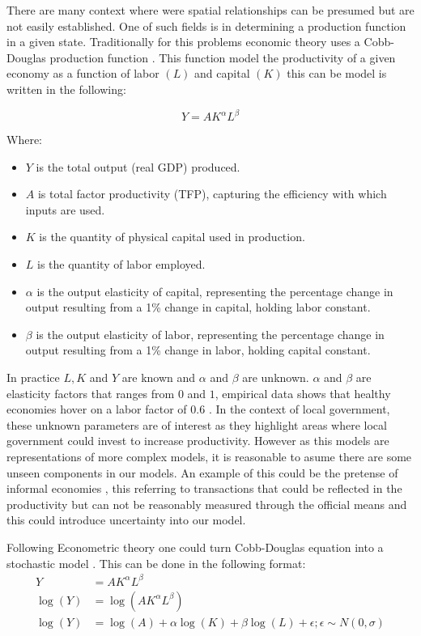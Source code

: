 

There are many context where were spatial relationships can be presumed but are not easily established. One
of such fields is in determining a production function in a given state. Traditionally for this problems economic
theory uses a Cobb-Douglas production function \cite{cobb1928theory}. This function model the productivity of a
given economy as a function of labor $(L)$ and capital $(K)$ this can be model is written in the following:

$$
	Y = A K^\alpha L^\beta
$$

Where:
\begin{itemize}
	\item $Y$ is the total output (real GDP) produced.
	\item $A$ is total factor productivity (TFP), capturing the efficiency with which inputs are used.
	\item $K$ is the quantity of physical capital used in production.
	\item $L$ is the quantity of labor employed.
	\item $\alpha$ is the output elasticity of capital, representing the percentage change in output
	      resulting from a 1\% change in capital, holding labor constant.
	\item $\beta$ is the output elasticity of labor, representing the percentage change in output
	      resulting from a 1\% change in labor, holding capital constant.
\end{itemize}

In practice $L,K$ and $Y$ are known and $\alpha$ and $\beta$ are unknown. $\alpha$ and $\beta$ are elasticity factors that ranges
from $0$ and $1$, empirical data shows that healthy economies hover on a labor factor of $0.6$ \cite{douglas1976cobb}.
In the context of local government, these unknown parameters are of interest as they highlight areas where local government
could invest to increase productivity. However as this models are representations of more complex models, it is
reasonable to asume there are some unseen components in our models. An example of this could be the pretense of
informal economies \cite{williams1994spatial}, this referring to transactions that could be reflected in the productivity but can not
be reasonably measured through the official means and this could introduce uncertainty into our model.

Following Econometric theory one could turn Cobb-Douglas equation into a stochastic model \cite{zellner1966specification}.
This can be done in the following format:
\[
	\begin{split}
		Y         & = A K^\alpha L^\beta                                                             \\
		\log{(Y)} & = \log{(A K^\alpha L^\beta)}                                                     \\
		\log(Y)   & = \log(A) + \alpha \log(K) + \beta \log(L) +\epsilon ; \epsilon \sim N(0,\sigma)
	\end{split}
\]



